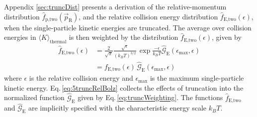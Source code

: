 Appendix \ref{sec:truncDist} presents a derivation of the relative-momentum distribution $\hat{f}_\text{p,two}(\vec{p}_\text{R})$, and the relative collision energy distribution $\hat{f}_\text{E,two}(\epsilon)$, when the single-particle kinetic energies are truncated.
The average over collision energies in $\langle K \rangle_\text{thermal}$ is then weighted by the distribution $\hat{f}_\text{E,two}(\epsilon)$, given by
\begin{align} \label{eq:5truncRelBolz}
	\hat{f}_\text{E,two}(\epsilon) &= \frac{2}{\sqrt{\pi}} \frac{\sqrt{\epsilon}}{(k_B T)^{3/2}} \, \exp{\frac{-\epsilon}{k_B T}} \hat{\mathcal{G}}_\text{E}(\epsilon_\text{max},\epsilon) \\
	\nonumber
								   &= f_\text{E,two}(\epsilon) \, \hat{\mathcal{G}}_\text{E}(\epsilon_\text{max},\epsilon)
\end{align}
where $\epsilon$ is the relative collision energy and $\epsilon_\text{max}$ is the maximum single-particle kinetic energy.
Eq.\,\ref{eq:5truncRelBolz} collects the effects of truncation into the normalized function $\hat{\mathcal{G}}_\text{E}$ given by Eq.\,\ref{eq:truncWeighting}.
The functions $\hat{f}_\text{E,two}$ and $\hat{\mathcal{G}}_\text{E}$ are implicitly specified with the characteristic energy scale $k_B T$.

